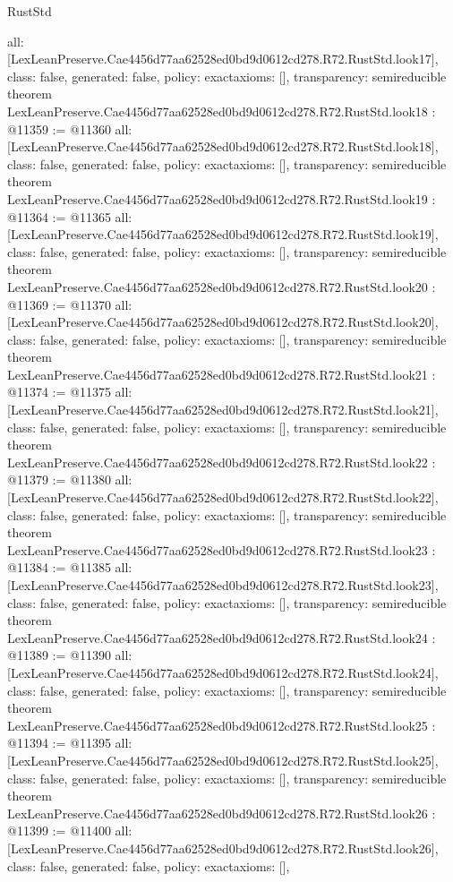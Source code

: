 \begin{lexlean}{RustStd}
\begin{coremodule}
{  all: [LexLeanPreserve.Cae4456d77aa62528ed0bd9d0612cd278.R72.RustStd.look17],
  class: false,
  generated: false,
  policy: exact{axioms: []},
  transparency: semireducible
}
theorem LexLeanPreserve.Cae4456d77aa62528ed0bd9d0612cd278.R72.RustStd.look18 : @11359 := @11360 {
  all: [LexLeanPreserve.Cae4456d77aa62528ed0bd9d0612cd278.R72.RustStd.look18],
  class: false,
  generated: false,
  policy: exact{axioms: []},
  transparency: semireducible
}
theorem LexLeanPreserve.Cae4456d77aa62528ed0bd9d0612cd278.R72.RustStd.look19 : @11364 := @11365 {
  all: [LexLeanPreserve.Cae4456d77aa62528ed0bd9d0612cd278.R72.RustStd.look19],
  class: false,
  generated: false,
  policy: exact{axioms: []},
  transparency: semireducible
}
theorem LexLeanPreserve.Cae4456d77aa62528ed0bd9d0612cd278.R72.RustStd.look20 : @11369 := @11370 {
  all: [LexLeanPreserve.Cae4456d77aa62528ed0bd9d0612cd278.R72.RustStd.look20],
  class: false,
  generated: false,
  policy: exact{axioms: []},
  transparency: semireducible
}
theorem LexLeanPreserve.Cae4456d77aa62528ed0bd9d0612cd278.R72.RustStd.look21 : @11374 := @11375 {
  all: [LexLeanPreserve.Cae4456d77aa62528ed0bd9d0612cd278.R72.RustStd.look21],
  class: false,
  generated: false,
  policy: exact{axioms: []},
  transparency: semireducible
}
theorem LexLeanPreserve.Cae4456d77aa62528ed0bd9d0612cd278.R72.RustStd.look22 : @11379 := @11380 {
  all: [LexLeanPreserve.Cae4456d77aa62528ed0bd9d0612cd278.R72.RustStd.look22],
  class: false,
  generated: false,
  policy: exact{axioms: []},
  transparency: semireducible
}
theorem LexLeanPreserve.Cae4456d77aa62528ed0bd9d0612cd278.R72.RustStd.look23 : @11384 := @11385 {
  all: [LexLeanPreserve.Cae4456d77aa62528ed0bd9d0612cd278.R72.RustStd.look23],
  class: false,
  generated: false,
  policy: exact{axioms: []},
  transparency: semireducible
}
theorem LexLeanPreserve.Cae4456d77aa62528ed0bd9d0612cd278.R72.RustStd.look24 : @11389 := @11390 {
  all: [LexLeanPreserve.Cae4456d77aa62528ed0bd9d0612cd278.R72.RustStd.look24],
  class: false,
  generated: false,
  policy: exact{axioms: []},
  transparency: semireducible
}
theorem LexLeanPreserve.Cae4456d77aa62528ed0bd9d0612cd278.R72.RustStd.look25 : @11394 := @11395 {
  all: [LexLeanPreserve.Cae4456d77aa62528ed0bd9d0612cd278.R72.RustStd.look25],
  class: false,
  generated: false,
  policy: exact{axioms: []},
  transparency: semireducible
}
theorem LexLeanPreserve.Cae4456d77aa62528ed0bd9d0612cd278.R72.RustStd.look26 : @11399 := @11400 {
  all: [LexLeanPreserve.Cae4456d77aa62528ed0bd9d0612cd278.R72.RustStd.look26],
  class: false,
  generated: false,
  policy: exact{axioms: []},
}
\end{coremodule}
\end{lexlean}
